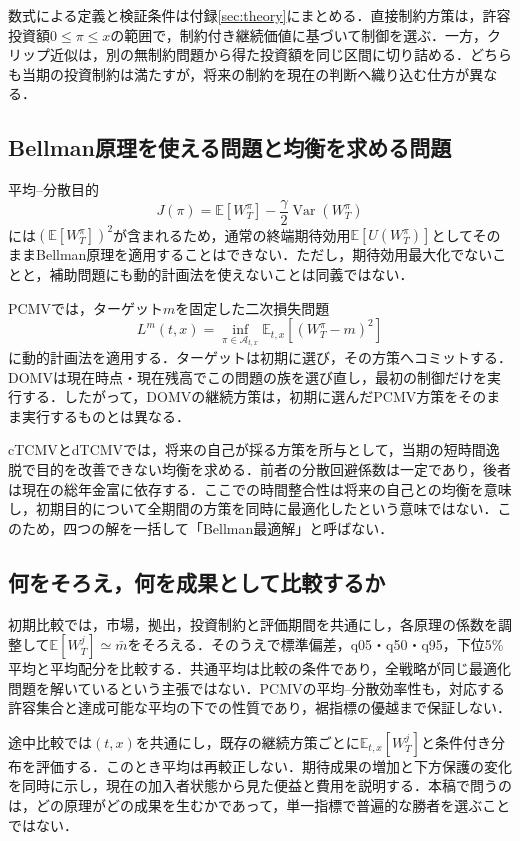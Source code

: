 \documentclass[10pt,a4paper]{article}
\theoremstyle{plain}
\theoremstyle{definition}
\newcommand{\E}{\mathbb{E}}
\DeclareMathOperator{\Var}{Var}
\begin{document}
数式による定義と検証条件は付録\ref{sec:theory}にまとめる．直接制約方策は，許容投資額$0\leq\pi\leq x$の範囲で，制約付き継続価値に基づいて制御を選ぶ．一方，クリップ近似は，別の無制約問題から得た投資額を同じ区間に切り詰める．どちらも当期の投資制約は満たすが，将来の制約を現在の判断へ織り込む仕方が異なる．

\subsection{Bellman原理を使える問題と均衡を求める問題}
平均--分散目的
\[
J(\pi)=\E[W_T^{\pi}]-\frac{\gamma}{2}\Var(W_T^{\pi})
\]
には$(\E[W_T^{\pi}])^2$が含まれるため，通常の終端期待効用$\E[U(W_T^{\pi})]$としてそのままBellman原理を適用することはできない．ただし，期待効用最大化でないことと，補助問題にも動的計画法を使えないことは同義ではない．

PCMVでは，ターゲット$m$を固定した二次損失問題
\[
L^m(t,x)=\inf_{\pi\in\mathcal A_{t,x}}\E_{t,x}[(W_T^{\pi}-m)^2]
\]
に動的計画法を適用する．ターゲットは初期に選び，その方策へコミットする．DOMVは現在時点・現在残高でこの問題の族を選び直し，最初の制御だけを実行する．したがって，DOMVの継続方策は，初期に選んだPCMV方策をそのまま実行するものとは異なる．

cTCMVとdTCMVでは，将来の自己が採る方策を所与として，当期の短時間逸脱で目的を改善できない均衡を求める．前者の分散回避係数は一定であり，後者は現在の総年金富に依存する．ここでの時間整合性は将来の自己との均衡を意味し，初期目的について全期間の方策を同時に最適化したという意味ではない．このため，四つの解を一括して「Bellman最適解」と呼ばない．

\subsection{何をそろえ，何を成果として比較するか}
初期比較では，市場，拠出，投資制約と評価期間を共通にし，各原理の係数を調整して$\E[W_T^j]\simeq\bar m$をそろえる．そのうえで標準偏差，q05・q50・q95，下位5\%平均と平均配分を比較する．共通平均は比較の条件であり，全戦略が同じ最適化問題を解いているという主張ではない．PCMVの平均--分散効率性も，対応する許容集合と達成可能な平均の下での性質であり，裾指標の優越まで保証しない．

途中比較では$(t,x)$を共通にし，既存の継続方策ごとに$\E_{t,x}[W_T^j]$と条件付き分布を評価する．このとき平均は再較正しない．期待成果の増加と下方保護の変化を同時に示し，現在の加入者状態から見た便益と費用を説明する．本稿で問うのは，どの原理がどの成果を生むかであって，単一指標で普遍的な勝者を選ぶことではない．
\end{document}
